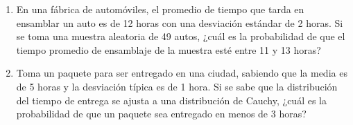\begin{Ejer}
\begin{enumerate}
    \item En una fábrica de automóviles, el promedio de tiempo que tarda en ensamblar un auto es de 12 horas con una desviación estándar de 2 horas. Si se toma una muestra aleatoria de 49 autos, ¿cuál es la probabilidad de que el tiempo promedio de ensamblaje de la muestra esté entre 11 y 13 horas?
    \item Toma un paquete para ser entregado en una ciudad, sabiendo que la media es de 5 horas y la desviación típica es de 1 hora. Si se sabe que la distribución del tiempo de entrega se ajusta a una distribución de Cauchy, ¿cuál es la probabilidad de que un paquete sea entregado en menos de 3 horas?

\end{enumerate}
\end{Ejer} 


